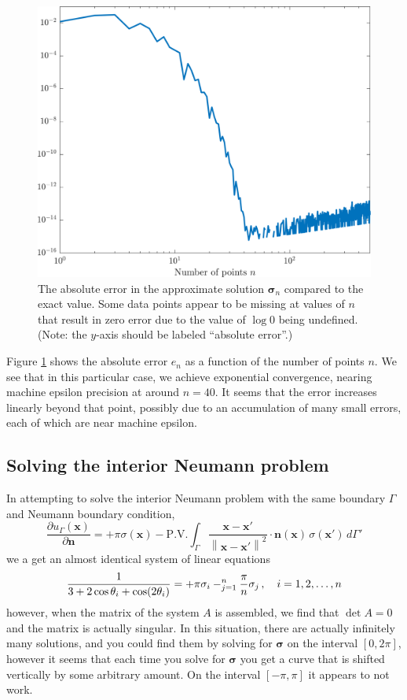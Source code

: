 \documentclass[11pt]{article}
\let\sumop\relax
\newcommand\p[2]{\frac{\partial #1}{\partial #2}}
\newcommand{\norm}[1]{\left\lVert#1\right\rVert}
\begin{document}
\begin{figure}[!htb]
  \centering
  \includegraphics[width=0.9\linewidth]{sigma_error.png}
  \caption{The absolute error in the approximate solution $\bm{\sigma}_n$ compared to the exact value. Some data points appear to be missing at values of $n$ that result in zero error due to the value of $\log 0$ being undefined. (Note: the $y$-axis should be labeled ``absolute error''.)}
  \label{fig:sigma_error}
\end{figure}

Figure \ref{fig:sigma_error} shows the absolute error $e_n$ as a function of the number of points $n$. We see that in this particular case, we achieve exponential convergence, nearing machine epsilon precision at around $n=40$. It seems that the error increases linearly beyond that point, possibly due to an accumulation of many small errors, each of which are near machine epsilon.

\subsection{Solving the interior Neumann problem}
In attempting to solve the interior Neumann problem with the same boundary $\Gamma$ and Neumann boundary condition,
\begin{equation}
\p{u_\Gamma(\bm{x})}{\bm{n}}
= +\pi\sigma(\bm{x}) - \mathrm{P.V.}\int_\Gamma \frac{\bm{x-x'}}{\norm{\bm{x-x'}}^2} \cdot \bm{n}(\bm{x}) \, \sigma(\bm{x}') \, d\Gamma'
\end{equation}
we a get an almost identical system of linear equations
\begin{equation*}
\frac{1}{3 + 2\cos\theta_i + \cos(2\theta_i)}
= +\pi\sigma_i - \sumop_{j=1}^n \frac{\pi}{n} \sigma_j \, , \quad i = 1,2,\dots,n
\end{equation*}
however, when the matrix of the system $A$ is assembled, we find that $\det A = 0$ and the matrix is actually singular. In this situation, there are actually infinitely many solutions, and you could find them by solving for $\bm{\sigma}$ on the interval $[0,2\pi]$, however it seems that each time you solve for $\bm{\sigma}$ you get a curve that is shifted vertically by some arbitrary amount. On the interval $[-\pi,\pi]$ it appears to not work.
\end{document}
